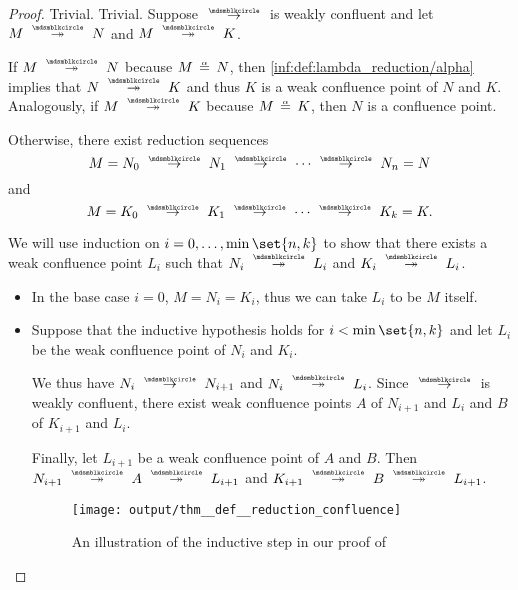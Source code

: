 \begin{proof}
   Trivial.
   Trivial.
   Suppose \( {\pred} \) is weakly confluent and let \( M \pred* N \) and \( M \pred* K \).

  If \( M \pred* N \) because \( M \aequiv N \), then \ref{inf:def:lambda_reduction/alpha} implies that \( N \pred* K \) and thus \( K \) is a weak confluence point of \( N \) and \( K \). Analogously, if \( M \pred* K \) because \( M \aequiv K \), then \( N \) is a confluence point.

  Otherwise, there exist reduction sequences
  \begin{equation*}
    M = N_0 \pred N_1 \pred \cdots \pred N_n = N
  \end{equation*}
  and
  \begin{equation*}
    M = K_0 \pred K_1 \pred \cdots \pred K_k = K.
  \end{equation*}

  We will use induction on \( i = 0, \ldots, \min\set{ n, k } \) to show that there exists a weak confluence point \( L_i \) such that \( N_i \pred* L_i \) and \( K_i \pred* L_i \).

  \begin{itemize}
    \item In the base case \( i = 0 \), \( M = N_i = K_i \), thus we can take \( L_i \) to be \( M \) itself.

    \item Suppose that the inductive hypothesis holds for \( i < \min\set{ n, k } \) and let \( L_i \) be the weak confluence point of \( N_i \) and \( K_i \).

    We thus have \( N_i \pred N_{i+1} \) and \( N_i \pred* L_i \). Since \( {\pred} \) is weakly confluent, there exist weak confluence points \( A \) of \( N_{i+1} \) and \( L_i \) and \( B \) of \( K_{i+1} \) and \( L_i \).

    Finally, let \( L_{i+1} \) be a weak confluence point of \( A \) and \( B \). Then \( N_{i+1} \pred* A \pred* L_{i+1} \) and \( K_{i+1} \pred* B \pred* L_{i+1} \).

    \begin{figure}[!ht]
      \centering
      \texttt{[image: output/thm\_\_def\_\_reduction\_confluence]}
      \caption{An illustration of the inductive step in our proof of }\label{fig:thm:confluence_of_reflexive_transitive_closure}
    \end{figure}
  \end{itemize}


\end{proof}
